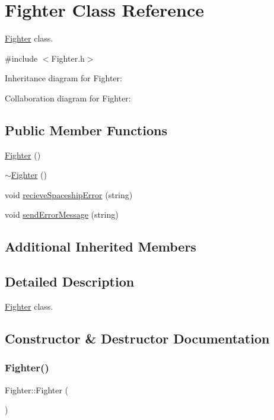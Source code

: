 \hypertarget{classFighter}{}\section{Fighter Class Reference}
\label{classFighter}


\hyperlink{classFighter}{Fighter} class.  




{\ttfamily \#include $<$Fighter.\+h$>$}



Inheritance diagram for Fighter\+:


Collaboration diagram for Fighter\+:
\subsection*{Public Member Functions}
\begin{DoxyCompactItemize}
\item 
\hyperlink{classFighter_ae1d4ac29ed8dac91af41e6396ee00dda}{Fighter} ()
\item 
\hyperlink{classFighter_a7c7f2ffa4724887e564af51a6154b703}{$\sim$\+Fighter} ()
\item 
void \hyperlink{classFighter_aecd2761c68aed8499e210fd0ca11c447}{recieve\+Spaceship\+Error} (string)
\item 
void \hyperlink{classFighter_a42b60e52427e5c69daf141351655805c}{send\+Error\+Message} (string)
\end{DoxyCompactItemize}
\subsection*{Additional Inherited Members}


\subsection{Detailed Description}
\hyperlink{classFighter}{Fighter} class. 

\subsection{Constructor \& Destructor Documentation}
\mbox{\label{classFighter_ae1d4ac29ed8dac91af41e6396ee00dda}} 
\subsubsection{\texorpdfstring{Fighter()}{Fighter()}}
{\footnotesize\ttfamily Fighter\+::\+Fighter (\begin{DoxyParamCaption}{ }\end{DoxyParamCaption})\hspace{0.3cm}{\ttfamily [inline]}}

